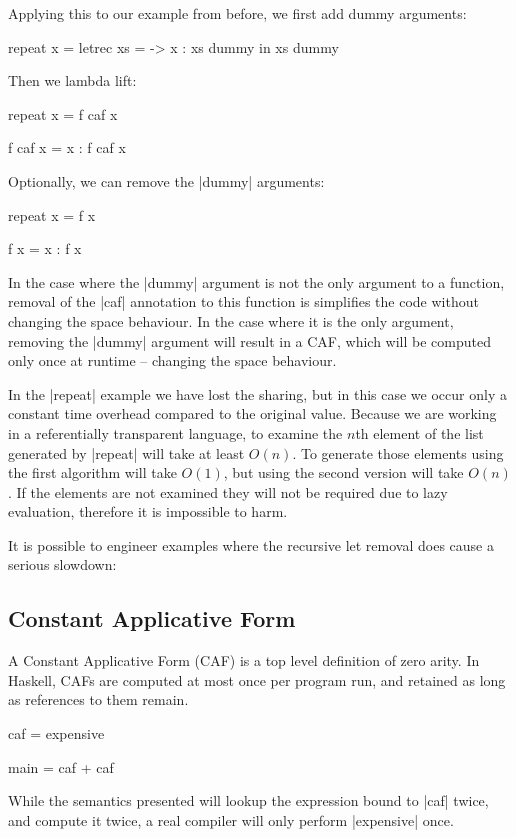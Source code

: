 Applying this to our example from before, we first add dummy arguments:

\begin{code}
repeat x =  letrec xs = \dummy ->  x : xs dummy
            in xs dummy
\end{code}

Then we lambda lift:

\begin{code}
repeat x = f caf x

f caf x = x : f caf x
\end{code}

Optionally, we can remove the |dummy| arguments:

\begin{code}
repeat x = f x

f x = x : f x
\end{code}

In the case where the |dummy| argument is not the only argument to a function, removal of the |caf| annotation to this function is simplifies the code without changing the space behaviour. In the case where it is the only argument, removing the |dummy| argument will result in a CAF, which will be computed only once at runtime -- changing the space behaviour.

In the |repeat| example we have lost the sharing, but in this case we occur only a constant time overhead compared to the original value. Because we are working in a referentially transparent language, to examine the $n$th element of the list generated by |repeat| will take at least $O(n)$. To generate those elements using the first algorithm will take $O(1)$, but using the second version will take $O(n)$. If the elements are not examined they will not be required due to lazy evaluation, therefore it is impossible to harm.

It is possible to engineer examples where the recursive let removal does cause a serious slowdown:

\subsection{Constant Applicative Form}

A Constant Applicative Form (CAF) is a top level definition of zero arity. In Haskell, CAFs are computed at most once per program run, and retained as long as references to them remain.

\begin{example}
\begin{code}
caf = expensive

main = caf + caf
\end{code}

While the semantics presented will lookup the expression bound to |caf| twice, and compute it twice, a real compiler will only perform |expensive| once.
\end{example}

